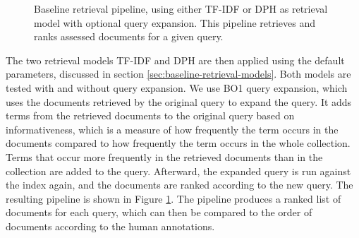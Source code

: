 \begin{figure}[tb]
\caption{Baseline retrieval pipeline, using either TF-IDF or DPH as retrieval model with optional query expansion. This pipeline retrieves and ranks assessed documents for a given query.}
\label{fig:baseline-pipeline}
\end{figure}
The two retrieval models TF-IDF and DPH are then applied using the default parameters, discussed in section \ref{sec:baseline-retrieval-models}.
Both models are tested with and without query expansion.
We use BO1 query expansion, which uses the documents retrieved by the original query to expand the query.
It adds terms from the retrieved documents to the original query based on informativeness, which is a measure of how frequently the term occurs in the documents compared to how frequently the term occurs in the whole collection.
Terms that occur more frequently in the retrieved documents than in the collection are added to the query.
Afterward, the expanded query is run against the index again, and the documents are ranked according to the new query.
The resulting pipeline is shown in Figure \ref{fig:baseline-pipeline}.
The pipeline produces a ranked list of documents for each query, which can then be compared to the order of documents according to the human annotations.

